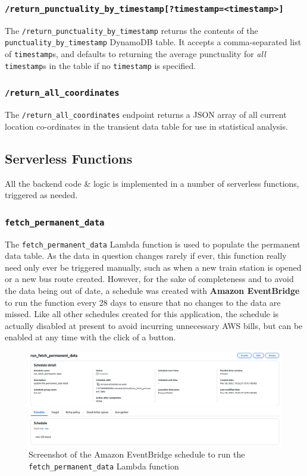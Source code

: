 \documentclass[a4paper,11pt]{report}
\begin{document}
\subsubsection{\texttt{/return\_punctuality\_by\_timestamp[?timestamp=<timestamp>]}}
The \verb|/return_punctuality_by_timestamp| returns the contents of the \verb|punctuality_by_timestamp| DynamoDB table.
It accepts a comma-separated list of \verb|timestamp|s, and defaults to returning the average punctuality for \textit{all} \verb|timestamp|s in the table if no \verb|timestamp| is specified. 

\subsubsection{\texttt{/return\_all\_coordinates}}
The \verb|/return_all_coordinates| endpoint returns a JSON array of all current location co-ordinates in the transient data table for use in statistical analysis.

\subsection{Serverless Functions}
All the backend code \& logic is implemented in a number of serverless functions, triggered as needed.

\subsubsection{\texttt{fetch_permanent_data}}
The \verb|fetch_permanent_data| Lambda function is used to populate the permanent data table.
As the data in question changes rarely if ever, this function really need only ever be triggered manually, such as when a new train station is opened or a new bus route created.
However, for the sake of completeness and to avoid the data being out of date, a schedule was created with \textbf{Amazon EventBridge} to run the function every 28 days to ensure that no changes to the data are missed.
Like all other schedules created for this application, the schedule is actually disabled at present to avoid incurring unnecessary AWS bills, but can be enabled at any time with the click of a button.

\begin{figure}[H]
    \centering
    \includegraphics[width=\textwidth]{./images/fetch_permanent_data_schedule.png}
    \caption{Screenshot of the Amazon EventBridge schedule to run the \texttt{fetch_permanent_data} Lambda function}
\end{figure}
\end{document}
